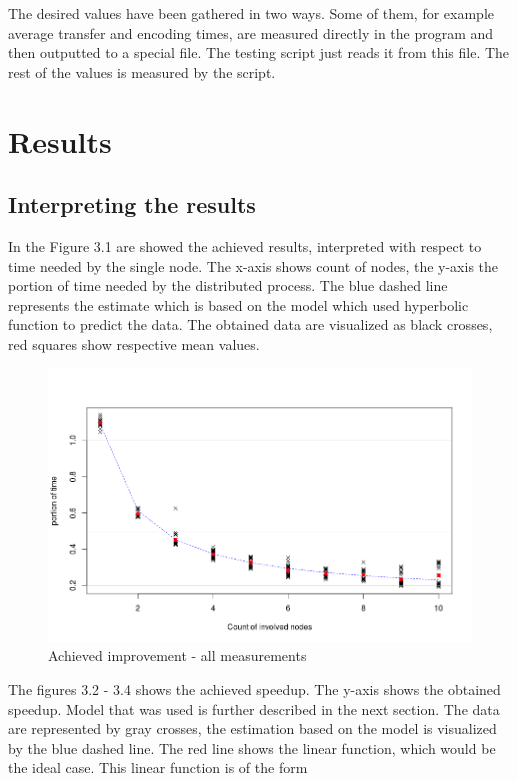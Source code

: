The desired values have been gathered in two ways. Some of them, for
example average transfer and encoding times, are measured directly in
the program and then outputted to a special file. The testing script
just reads it from this file. The rest of the values is measured by the
script.

\section{Results}\label{results}

\subsection{Interpreting the results}\label{interpreting-the-results}

In the Figure 3.1 are showed the achieved results, interpreted with
respect to time needed by the single node. The x-axis shows count of
nodes, the y-axis the portion of time needed by the distributed process.
The blue dashed line represents the estimate which is based on the model
which used hyperbolic function to predict the data. The obtained data
are visualized as black crosses, red squares show respective mean
values.

\begin{figure}[h]
\begin{center}
\includegraphics[scale=0.45]{./img/improvement_root.png}
\caption{Achieved improvement - all measurements}
\end{center}
\end{figure}

The figures 3.2 - 3.4 shows the achieved speedup. The y-axis shows the
obtained speedup. Model that was used is further described in the next
section. The data are represented by gray crosses, the estimation based
on the model is visualized by the blue dashed line. The red line shows
the linear function, which would be the ideal case. This linear function
is of the form

